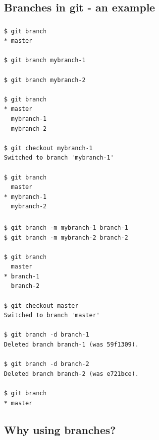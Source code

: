 \subsection{Branches in git - an example}
\begin{frame}[fragile]
  \frametitle{\insertsubsection}

  \begin{small}
\begin{verbatim}
$ git branch
* master

$ git branch mybranch-1

$ git branch mybranch-2

$ git branch
* master
  mybranch-1
  mybranch-2

$ git checkout mybranch-1
Switched to branch 'mybranch-1'

$ git branch
  master
* mybranch-1
  mybranch-2
\end{verbatim}
  \end{small}

\end{frame}
\begin{frame}[fragile]
  \frametitle{\insertsubsection}

  \begin{small}
\begin{verbatim}
$ git branch -m mybranch-1 branch-1
$ git branch -m mybranch-2 branch-2

$ git branch
  master
* branch-1
  branch-2

$ git checkout master
Switched to branch 'master'

$ git branch -d branch-1
Deleted branch branch-1 (was 59f1309).

$ git branch -d branch-2
Deleted branch branch-2 (was e721bce).

$ git branch
* master
\end{verbatim}
  \end{small}

\end{frame}


\subsection{Why using branches?}

